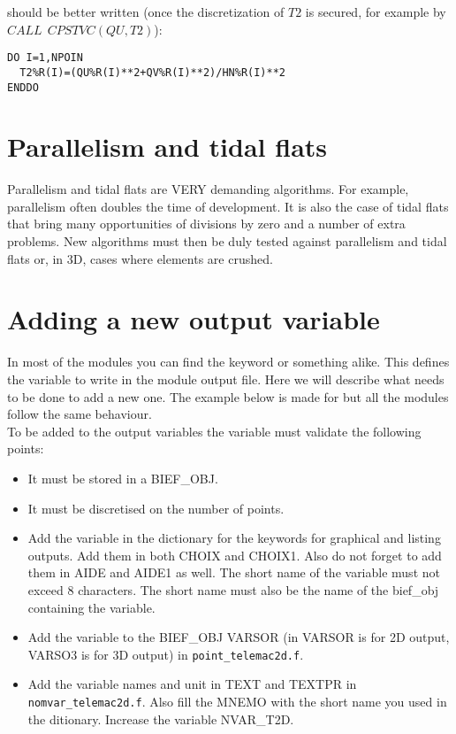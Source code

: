 should be better written (once the discretization of $T2$ is secured, for
example by $CALL~~CPSTVC(QU, T2)$):

\begin{lstlisting}
DO I=1,NPOIN
  T2%R(I)=(QU%R(I)**2+QV%R(I)**2)/HN%R(I)**2
ENDDO
\end{lstlisting}

\section{Parallelism and tidal flats}

Parallelism and tidal flats are VERY demanding algorithms. For example,
parallelism often doubles the time of development. It is also the case of tidal
flats that bring many opportunities of divisions by zero and a number of extra
problems. New algorithms must then be duly tested against parallelism and tidal
flats or, in 3D, cases where elements are crushed.
%

\section{Adding a new output variable}

In most of the modules you can find the keyword  or something alike.  This defines the variable to write in the module
output file. Here we will describe what needs to be done to add a new one. The
example below is made for  but all the modules follow the same
behaviour.\\

To be added to the output variables the variable must validate the following
points:
\begin{itemize}
  \item It must be stored in a BIEF\_OBJ.
  \item It must be discretised on the number of points.
\end{itemize}

\begin{itemize}
  \item Add the variable in the dictionary for the keywords for graphical and
    listing outputs. Add them in both CHOIX and CHOIX1. Also do not forget to
    add them in AIDE and AIDE1 as well. The short name of the variable must not
    exceed 8 characters. The short name must also be the name of the bief\_obj
    containing the variable.
  \item Add the variable to the BIEF\_OBJ VARSOR (in  VARSOR is
    for 2D output, VARSO3 is for 3D output) in \verb!point_telemac2d.f!.
  \item Add the variable names and unit in TEXT and TEXTPR in
    \verb!nomvar_telemac2d.f!. Also fill the MNEMO with the short name you used
    in the ditionary. Increase the variable NVAR\_T2D.
\end{itemize}
